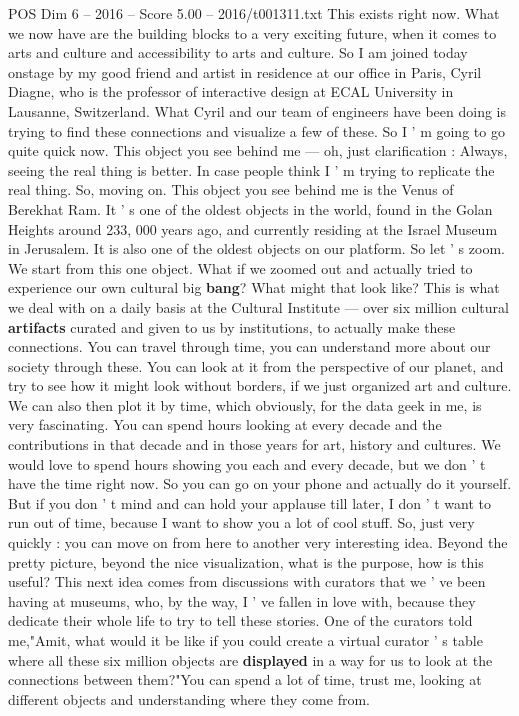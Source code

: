 \begin{textsample}{POS Dim 6 – 2016 – Score 5.00 – 2016/t001311.txt}
This exists right now.
What we now have are the building blocks to a very exciting future, when it comes to arts and culture and accessibility to arts and culture.
So I am joined today onstage by my good friend and artist in residence at our office in Paris, Cyril Diagne, who is the professor of interactive design at ECAL University in Lausanne, Switzerland.
What Cyril and our team of engineers have been doing is trying to find these connections and visualize a few of these.
So I ' m going to go quite quick now.
This object you see behind me — oh, just clarification : Always, seeing the real thing is better.
In case people think I ' m trying to replicate the real thing.
So, moving on.
This object you see behind me is the Venus of Berekhat Ram.
It ' s one of the oldest objects in the world, found in the Golan Heights around 233, 000 years ago, and currently residing at the Israel Museum in Jerusalem.
It is also one of the oldest objects on our platform.
So let ' s zoom.
We start from this one object.
What if we zoomed out and actually tried to experience our own cultural big \textbf{bang}?
What might that look like?
This is what we deal with on a daily basis at the Cultural Institute — over six million cultural \textbf{artifacts} curated and given to us by institutions, to actually make these connections.
You can travel through time, you can understand more about our society through these.
You can look at it from the perspective of our planet, and try to see how it might look without borders, if we just organized art and culture.
We can also then plot it by time, which obviously, for the data geek in me, is very fascinating.
You can spend hours looking at every decade and the contributions in that decade and in those years for art, history and cultures.
We would love to spend hours showing you each and every decade, but we don ' t have the time right now.
So you can go on your phone and actually do it yourself.
But if you don ' t mind and can hold your applause till later, I don ' t want to run out of time, because I want to show you a lot of cool stuff.
So, just very quickly : you can move on from here to another very interesting idea.
Beyond the pretty picture, beyond the nice visualization, what is the purpose, how is this useful?
This next idea comes from discussions with curators that we ' ve been having at museums, who, by the way, I ' ve fallen in love with, because they dedicate their whole life to try to tell these stories.
One of the curators told me,"Amit, what would it be like if you could create a virtual curator ' s table where all these six million objects are \textbf{displayed} in a way for us to look at the connections between them?"You can spend a lot of time, trust me, looking at different objects and understanding where they come from.

\end{textsample}

